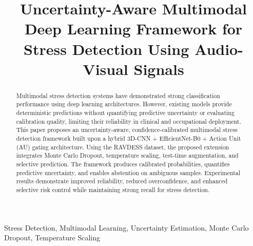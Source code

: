 \documentclass[conference]{IEEEtran}
\begin{document}
\title{Uncertainty-Aware Multimodal Deep Learning Framework for Stress Detection Using Audio-Visual Signals}

\author{

     \and

 
    \and
     
}


\maketitle

\begin{abstract}
Multimodal stress detection systems have demonstrated strong classification performance using deep learning architectures. However, existing models provide deterministic predictions without quantifying predictive uncertainty or evaluating calibration quality, limiting their reliability in clinical and occupational deployment. This paper proposes an uncertainty-aware, confidence-calibrated multimodal stress detection framework built upon a hybrid 3D-CNN + EfficientNet-B0 + Action Unit (AU) gating architecture. Using the RAVDESS dataset, the proposed extension integrates Monte Carlo Dropout, temperature scaling, test-time augmentation, and selective prediction. The framework produces calibrated probabilities, quantifies predictive uncertainty, and enables abstention on ambiguous samples. Experimental results demonstrate improved reliability, reduced overconfidence, and enhanced selective risk control while maintaining strong recall for stress detection.  
\end{abstract}
\begin{IEEEkeywords}
Stress Detection, Multimodal Learning, Uncertainty Estimation, Monte Carlo Dropout, Temperature Scaling
\end{IEEEkeywords}
\end{document}
